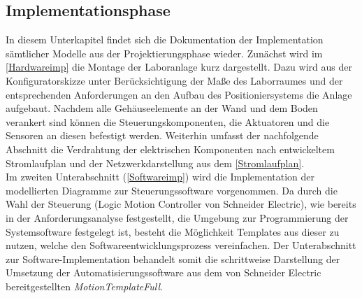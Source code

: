 \documentclass[../../../Bachelorarbeit.tex]{subfiles}
\begin{document}
\subsection{Implementationsphase} \label{implementation}
In diesem Unterkapitel findet sich die Dokumentation der Implementation sämtlicher Modelle aus der Projektierungsphase wieder. Zunächst wird im \autoref{Hardwareimp} die Montage der Laboranlage kurz dargestellt. Dazu wird aus der Konfiguratorskizze unter Berücksichtigung der Maße des Laborraumes und der entsprechenden Anforderungen an den Aufbau des Positioniersystems die Anlage aufgebaut. Nachdem alle Gehäuseelemente an der Wand und dem Boden verankert sind können die Steuerungskomponenten, die Aktuatoren und die Sensoren an diesen befestigt werden. Weiterhin umfasst der nachfolgende Abschnitt die Verdrahtung der elektrischen Komponenten nach entwickeltem Stromlaufplan und der Netzwerkdarstellung aus dem \autoref{Stromlaufplan}.\\
Im zweiten Unterabschnitt (\autoref{Softwareimp}) wird die Implementation der modellierten Diagramme zur Steuerungssoftware vorgenommen. Da durch die Wahl der Steuerung (Logic Motion Controller von Schneider Electric), wie bereits in der Anforderungsanalyse festgestellt, die Umgebung zur Programmierung der Systemsoftware festgelegt ist, besteht die Möglichkeit Templates aus dieser zu nutzen, welche den Softwareentwicklungsprozess vereinfachen. Der Unterabschnitt zur Software-Implementation behandelt somit die schrittweise Darstellung der Umsetzung der Automatisierungssoftware aus dem von Schneider Electric bereitgestellten \textit{MotionTemplateFull}.
\end{document}
